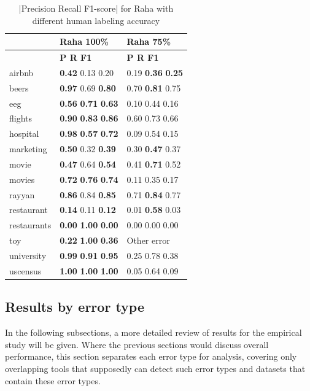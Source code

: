 \begin{table}
\centering
\caption{|Precision Recall F1-score| for Raha with different human labeling accuracy}
\label{tab:raha_empirical}
\begin{tabular}{lll}
\toprule
{} & Raha 100\% & Raha 75\% \\
\midrule
 & \textbf{\space\space\space P \space\space\space\space R \space\space\space F1} & \textbf{\space\space\space P \space\space\space\space R \space\space\space F1} \\
airbnb & \textbf{0.42} 0.13 0.20 & 0.19 \textbf{0.36} \textbf{0.25} \\
beers & \textbf{0.97} 0.69 \textbf{0.80} & 0.70 \textbf{0.81} 0.75 \\
eeg & \textbf{0.56} \textbf{0.71} \textbf{0.63} & 0.10 0.44 0.16 \\
flights & \textbf{0.90} \textbf{0.83} \textbf{0.86} & 0.60 0.73 0.66 \\
hospital & \textbf{0.98} \textbf{0.57} \textbf{0.72} & 0.09 0.54 0.15 \\
marketing & \textbf{0.50} 0.32 \textbf{0.39} & 0.30 \textbf{0.47} 0.37 \\
movie & \textbf{0.47} 0.64 \textbf{0.54} & 0.41 \textbf{0.71} 0.52 \\
movies & \textbf{0.72} \textbf{0.76} \textbf{0.74} & 0.11 0.35 0.17 \\
rayyan & \textbf{0.86} 0.84 \textbf{0.85} & 0.71 \textbf{0.84} 0.77 \\
restaurant & \textbf{0.14} 0.11 \textbf{0.12} & 0.01 \textbf{0.58} 0.03 \\
restaurants & \textbf{0.00} \textbf{1.00} \textbf{0.00} & 0.00 0.00 0.00 \\
toy & \textbf{0.22} \textbf{1.00} \textbf{0.36} & Other error \\
university & \textbf{0.99} \textbf{0.91} \textbf{0.95} & 0.25 0.78 0.38 \\
uscensus & \textbf{1.00} \textbf{1.00} \textbf{1.00} & 0.05 0.64 0.09 \\
\bottomrule
\end{tabular}
\end{table}

\subsection{Results by error type}
In the following subsections, a more detailed review of results for the empirical study will be given. Where the previous sections would discuss overall performance, this section separates each error type for analysis, covering only overlapping tools that supposedly can detect such error types and datasets that contain these error types.

